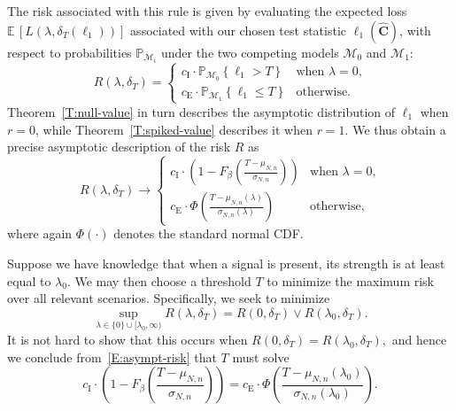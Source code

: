 \documentclass[final]{IEEEtran} %
\newcommand{\matrixsymbol}{\boldsymbol}
\newcommand{\mhC}{\widehat{\matrixsymbol{C}}}
\newcommand{\ulambda}{\lambda_0}
\newcommand{\ce}{c_\text{E}}
\newcommand{\ci}{c_\text{I}}
\newcommand{\E}{\mathbb{E}}
\newcommand{\Prob}{\mathbb{P}}
\begin{document}
The risk associated with this rule is given by evaluating the expected loss $\E \, [ L( \lambda, \delta_T( \ell_1 ) )]$ associated with our chosen test statistic $\ell_1(\mhC)$, with respect to probabilities $\Prob_{\mathcal{M}_i}$ under the two competing models $\mathcal{M}_0$ and $\mathcal{M}_1$:
\begin{equation*}
    R( \lambda, \delta_T )
         = \begin{cases}
               \ci \cdot \Prob_{\mathcal{M}_0} \! \left\{ \ell_1 > T \right\}
                   &\text{when $\lambda=0$,} \\
               \ce \! \cdot \Prob_{\mathcal{M}_1} \! \left\{ \ell_1 \leq T \right\}
                   &\text{otherwise.}
           \end{cases}
\end{equation*}
Theorem~\ref{T:null-value} in turn describes the asymptotic distribution of $\ell_1$ when
$r=0$, while Theorem~\ref{T:spiked-value} describes it when $r=1$.  We thus obtain a precise asymptotic description of the risk $R$ as
\begin{equation}\label{E:asympt-risk}
    R( \lambda, \delta_T )
    \to \begin{cases}
           \ci \cdot \left(1 - F_\beta \left( \frac{ T - \mu_{N,n} }
                                                   { \sigma_{N,n}} \right) \right)
               &\text{when $\lambda=0$,} \\
           \ce \cdot \Phi \left( \frac{T - \mu_{N,n} (\lambda)}
                                      { \sigma_{N,n} (\lambda)} \right)
               &\text{otherwise,}
       \end{cases}
\end{equation}
where again $\Phi( \cdot )$ denotes the standard normal CDF.

Suppose we have knowledge that when a signal is present, its strength is at least equal to $\ulambda$.  We may then choose a threshold $T$ to minimize the maximum risk over all relevant scenarios.  Specifically,
we seek to minimize
\begin{equation}\label{E:mm-risk}
    \sup_{\lambda \in \{ 0 \} \cup [\ulambda, \infty)}  \!\!\!\! R( \lambda, \delta_T )
    =
     R(0, \delta_T) \vee R(\ulambda, \delta_T)
    .
\end{equation}
It is not hard to show that this occurs when
\(
    R(0, \delta_T) = R(\ulambda, \delta_T),
\)
and hence we conclude from~\eqref{E:asympt-risk} that $T$ must solve
\begin{equation}\label{E:T-eqn}
    \textstyle
    \ci \cdot \left(1 - F_\beta \left( \frac{ T - \mu_{N,n} }
                                         { \sigma_{N,n}} \right) \!\right)
   \! =
    \ce \cdot \Phi \left( \frac{T - \mu_{N,n} (\ulambda)}
                            { \sigma_{N,n} (\ulambda)} \right) \!.
\end{equation}
\end{document}
